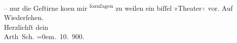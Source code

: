                – nur die Geſtirne ko{\geminationm}en mir \substVorne{}\textsuperscript{ſozuſagen }{\allowbreak}\substDazwischen{}zu weilen\substHinten{} ein biſſel »Theater\textcolor{gray}{«} vor.\pend
           \pstart
           Auf Wiederſehen.{\\[\baselineskip]}Herzlichſt dein{\\[\baselineskip]}\spacefill\mbox{Arth Sch.}\pend
           \leftskip=0em{}. 10. 900.\pend
           \endnumbering{}  
      